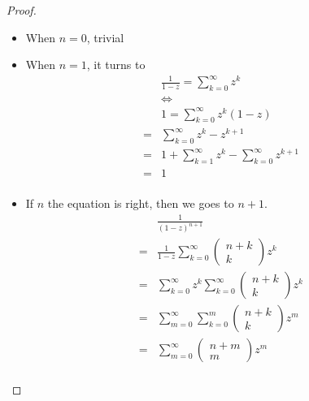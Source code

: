 \documentclass{ctexart}
\renewcommand{\(}{\left(}
\renewcommand{\)}{\right)}
\newcommand{\Iff}{\Leftrightarrow}
\begin{document}
\begin{proof}
    \begin{itemize}
        \item When $n=0$, trivial
        \item When $n=1$, it turns to 
        \begin{equation}
            \begin{aligned}
                &\frac{1}{1-z}=\sum_{k=0}^{\infty} z^k\\
               & \Iff \\
                &1=\sum_{k=0}^{\infty} z^k(1-z)\\
                =&\sum_{k=0}^{\infty}z^k-z^{k+1}\\
                =&1+\sum_{k=1}^{\infty}z^{k}-\sum_{k=0}^{\infty}z^{k+1}\\
                =&1\\
            \end{aligned}
        \end{equation}
        
        \item If $n$ the equation is right, then we goes to $n+1$.
        \begin{equation}
            \begin{aligned}
                &\frac{1}{(1-z)^{n+1}}\\
            =&\frac{1}{1-z}\sum_{k=0}^{\infty}\left(\begin{array}{c}
                n+k \\
                k
                \end{array}\right) z^k\\
            =&\sum_{k=0}^{\infty} z^k\sum_{k=0}^{\infty}\left(\begin{array}{c}
                n+k \\
                k
                \end{array}\right) z^k\\
            =&\sum_{m=0}^{\infty}\sum_{k=0}^{m}\(\begin{array}{c}
                n+k\\
                k
            \end{array}\)z^m\\
            =&\sum_{m=0}^{\infty}
            \(\begin{array}{c}
                n+m\\
                m
                 \end{array}\)z^m\\           
            \end{aligned}
        \end{equation}
    \end{itemize}
\end{proof}
\end{document}
